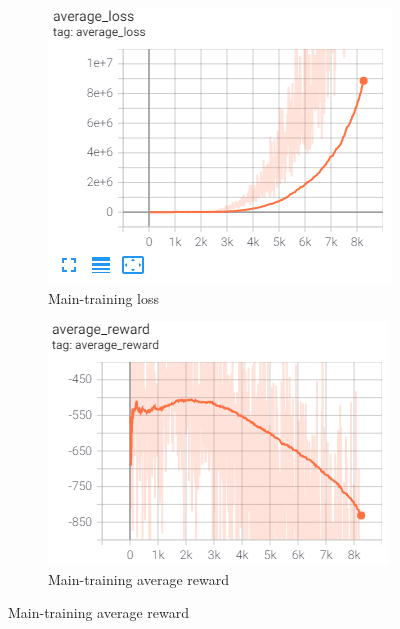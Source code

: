 \begin{figure}[ht]
	\centering
	\begin{subfigure}[b]{0.49\textwidth}
		\centering
		\includegraphics[width=\textwidth]{figures/training3-main-loss-smooth.PNG}
		\caption{Main-training loss}
		\label{fig:main-loss-smoothed-3}
	\end{subfigure}
	\hfill
	\begin{subfigure}[b]{0.49\textwidth}
		\centering
		\includegraphics[width=\textwidth]{figures/training3-main-reward-smooth.PNG}
		\caption{Main-training average reward}
		\label{fig:main-reward-smoothed-3}
	\end{subfigure}
\end{figure}

